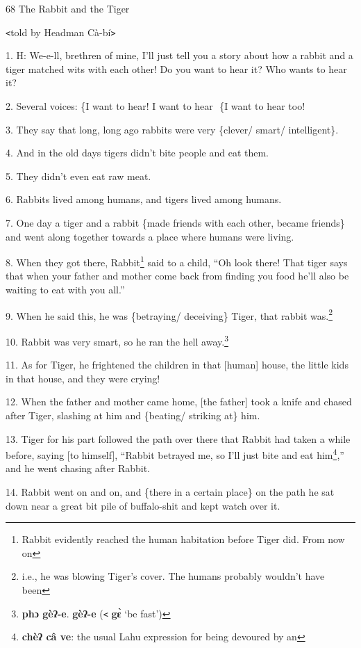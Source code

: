 
68 The Rabbit and the Tiger

\texttt{<}told by Headman Cà-bí\texttt{>}

1. H: We-e-ll, brethren of mine, I'll just tell you a story about how a rabbit
and a tiger matched wits with each other! Do you want to hear it? Who wants to
hear it?

2. Several voices: \{I want to hear! I want to hear          \{I want to hear
too!

3. They say that long, long ago rabbits were very \{clever/ smart/ intelligent\}.

4. And in the old days tigers didn't bite people and eat them.

5. They didn't even eat raw meat.

6. Rabbits lived among humans, and tigers lived among humans.

7. One day a tiger and a rabbit \{made friends with each other, became friends\}
and went along together towards a place where humans were living.

8. When they got there, Rabbit\footnote{Rabbit evidently reached the human habitation before Tiger did. From now on} said to a child, ``Oh look there! That tiger
says that when your father and mother come back from finding you food he'll also
be waiting to eat with you all.''

9. When he said this, he was \{betraying/ deceiving\} Tiger, that rabbit was.\footnote{i.e., he was blowing Tiger's cover. The humans probably wouldn't have been}

10. Rabbit was very smart, so he ran the hell away.\footnote{\textbf{ phɔ  gèʔ-e}. \textbf{gèʔ-e }(\texttt{<} \textbf{gɛ̀} `be fast')}

11. As for Tiger, he frightened the children in that [human] house, the little
kids in that house, and they were crying!

12. When the father and mother came home, [the father] took a knife and chased
after Tiger, slashing at him and \{beating/ striking at\} him.

13. Tiger for his part followed the path over there that Rabbit had taken a while
before, saying [to himself], ``Rabbit betrayed me, so I'll just bite and eat him\footnote{\textbf{chèʔ câ ve}: the usual Lahu expression for being devoured by an},''
and he went chasing after Rabbit.

14. Rabbit went on and on, and \{there in a certain place\} on the path he sat
down near a great bit pile of buffalo-shit and kept watch over it.

